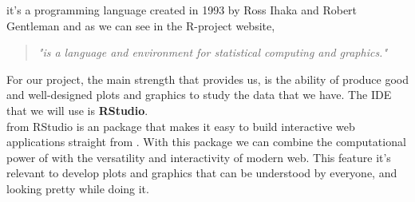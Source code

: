 \textbf{\R}  it's a programming language created in 1993 by Ross Ihaka and Robert Gentleman and as we can see in the \cite{R-project website} R-project website,
\begin{quote}
    \textit{"\R is a language and environment for statistical computing and graphics."} 
\end{quote} 

For our project, the main strength that \R provides us, is the
ability of produce good and well-designed plots and graphics to study the data that we have. The \ac{IDE} that we will use is \textbf{RStudio}.\\

\textbf{\Shiny} from RStudio is \cite{shiny} an \R package that makes it easy to build interactive web applications straight from \R. 
With this package we can combine the computational power of \R with the versatility and interactivity of modern web. This feature it's relevant to develop plots and graphics that can be understood by everyone, and looking pretty while doing it.